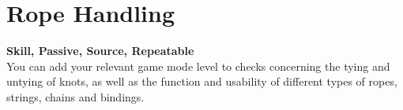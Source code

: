 \section{Rope Handling}\label{sec:ropeHandling}
\textbf{Skill, Passive, Source, Repeatable}\\
You can add your relevant game mode level to checks concerning the tying and untying of knots, as well as the function and usability of different types of ropes, strings, chains and bindings.